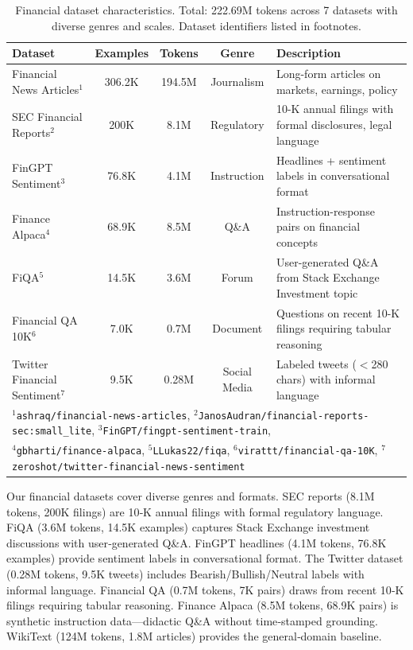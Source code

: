 \begin{table}[htbp]
\centering
\caption[Financial Dataset Characteristics]{Financial dataset characteristics. Total: 222.69M tokens across 7 datasets with diverse genres and scales. Dataset identifiers listed in footnotes.}
\label{tab:financial_datasets}
\small
\begin{tabular}{p{3.4cm}cccp{5.5cm}}
\toprule
\textbf{Dataset} & \textbf{Examples} & \textbf{Tokens} & \textbf{Genre} & \textbf{Description} \\
\midrule
Financial News Articles$^1$ & 306.2K & 194.5M & Journalism & Long-form articles on markets, earnings, policy \\
\midrule
SEC Financial Reports$^2$ & 200K & 8.1M & Regulatory & 10-K annual filings with formal disclosures, legal language \\
\midrule
FinGPT Sentiment$^3$ & 76.8K & 4.1M & Instruction & Headlines + sentiment labels in conversational format \\
\midrule
Finance Alpaca$^4$ & 68.9K & 8.5M & Q\&A & Instruction-response pairs on financial concepts \\
\midrule
FiQA$^5$ & 14.5K & 3.6M & Forum & User-generated Q\&A from Stack Exchange Investment topic \\
\midrule
Financial QA 10K$^6$ & 7.0K & 0.7M & Document & Questions on recent 10-K filings requiring tabular reasoning \\
\midrule
Twitter Financial Sentiment$^7$ & 9.5K & 0.28M & Social Media & Labeled tweets ($<$280 chars) with informal language \\
\bottomrule
\multicolumn{5}{l}{\footnotesize $^1$\texttt{ashraq/financial-news-articles}, $^2$\texttt{JanosAudran/financial-reports-sec:small\_lite}, $^3$\texttt{FinGPT/fingpt-sentiment-train},} \\
\multicolumn{5}{l}{\footnotesize $^4$\texttt{gbharti/finance-alpaca}, $^5$\texttt{LLukas22/fiqa}, $^6$\texttt{virattt/financial-qa-10K}, $^7$\texttt{zeroshot/twitter-financial-news-sentiment}}
\end{tabular}
\end{table}

Our financial datasets cover diverse genres and formats. SEC reports (8.1M tokens, 200K filings) are 10‑K annual filings with formal regulatory language. FiQA (3.6M tokens, 14.5K examples) captures Stack Exchange investment discussions with user‑generated Q\&A. FinGPT headlines (4.1M tokens, 76.8K examples) provide sentiment labels in conversational format. The Twitter dataset (0.28M tokens, 9.5K tweets) includes Bearish/Bullish/Neutral labels with informal language. Financial QA (0.7M tokens, 7K pairs) draws from recent 10‑K filings requiring tabular reasoning. Finance Alpaca (8.5M tokens, 68.9K pairs) is synthetic instruction data—didactic Q\&A without time‑stamped grounding. WikiText (124M tokens, 1.8M articles) provides the general‑domain baseline.

